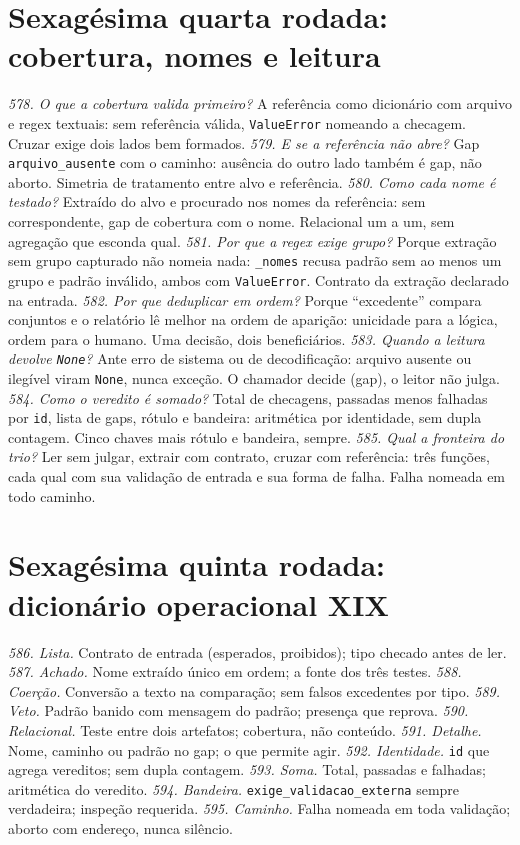 \section{Sexagésima quarta rodada: cobertura, nomes e leitura}
\textit{578. O que a cobertura valida primeiro?} A referência como dicionário com arquivo e regex textuais: sem referência válida, \texttt{ValueError} nomeando a checagem. Cruzar exige dois lados bem formados.
\textit{579. E se a referência não abre?} Gap \texttt{arquivo\_ausente} com o caminho: ausência do outro lado também é gap, não aborto. Simetria de tratamento entre alvo e referência.
\textit{580. Como cada nome é testado?} Extraído do alvo e procurado nos nomes da referência: sem correspondente, gap de cobertura com o nome. Relacional um a um, sem agregação que esconda qual.
\textit{581. Por que a regex exige grupo?} Porque extração sem grupo capturado não nomeia nada: \texttt{\_nomes} recusa padrão sem ao menos um grupo e padrão inválido, ambos com \texttt{ValueError}. Contrato da extração declarado na entrada.
\textit{582. Por que deduplicar em ordem?} Porque ``excedente'' compara conjuntos e o relatório lê melhor na ordem de aparição: unicidade para a lógica, ordem para o humano. Uma decisão, dois beneficiários.
\textit{583. Quando a leitura devolve \texttt{None}?} Ante erro de sistema ou de decodificação: arquivo ausente ou ilegível viram \texttt{None}, nunca exceção. O chamador decide (gap), o leitor não julga.
\textit{584. Como o veredito é somado?} Total de checagens, passadas menos falhadas por \texttt{id}, lista de gaps, rótulo e bandeira: aritmética por identidade, sem dupla contagem. Cinco chaves mais rótulo e bandeira, sempre.
\textit{585. Qual a fronteira do trio?} Ler sem julgar, extrair com contrato, cruzar com referência: três funções, cada qual com sua validação de entrada e sua forma de falha. Falha nomeada em todo caminho.
\section{Sexagésima quinta rodada: dicionário operacional XIX}
\textit{586. Lista.} Contrato de entrada (esperados, proibidos); tipo checado antes de ler.
\textit{587. Achado.} Nome extraído único em ordem; a fonte dos três testes.
\textit{588. Coerção.} Conversão a texto na comparação; sem falsos excedentes por tipo.
\textit{589. Veto.} Padrão banido com mensagem do padrão; presença que reprova.
\textit{590. Relacional.} Teste entre dois artefatos; cobertura, não conteúdo.
\textit{591. Detalhe.} Nome, caminho ou padrão no gap; o que permite agir.
\textit{592. Identidade.} \texttt{id} que agrega vereditos; sem dupla contagem.
\textit{593. Soma.} Total, passadas e falhadas; aritmética do veredito.
\textit{594. Bandeira.} \texttt{exige\_validacao\_externa} sempre verdadeira; inspeção requerida.
\textit{595. Caminho.} Falha nomeada em toda validação; aborto com endereço, nunca silêncio.
